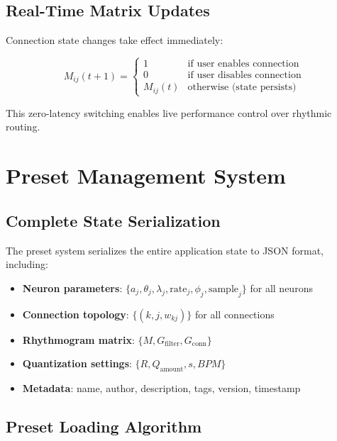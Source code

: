 \documentclass[11pt,a4paper]{article}
\begin{document}
\subsection{Real-Time Matrix Updates}

Connection state changes take effect immediately:

\begin{equation}
M_{ij}(t+1) = \begin{cases}
1 & \text{if user enables connection} \\
0 & \text{if user disables connection} \\
M_{ij}(t) & \text{otherwise (state persists)}
\end{cases}
\end{equation}

This zero-latency switching enables live performance control over rhythmic routing.

\section{Preset Management System}

\subsection{Complete State Serialization}

The preset system serializes the entire application state to JSON format, including:

\begin{itemize}
\item \textbf{Neuron parameters}: $\{a_j, \theta_j, \lambda_j, \text{rate}_j, \phi_j, \text{sample}_j\}$ for all neurons
\item \textbf{Connection topology}: $\{(k,j,w_{kj})\}$ for all connections
\item \textbf{Rhythmogram matrix}: $\{M, G_{\text{filter}}, G_{\text{conn}}\}$
\item \textbf{Quantization settings}: $\{R, Q_{\text{amount}}, s, BPM\}$
\item \textbf{Metadata}: name, author, description, tags, version, timestamp
\end{itemize}

\subsection{Preset Loading Algorithm}
\end{document}

